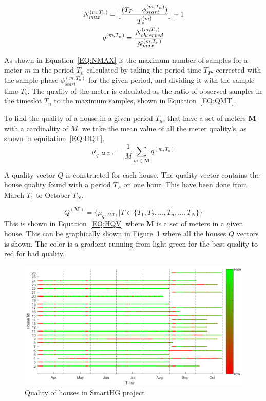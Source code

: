 \begin{gather}
		N_{max}^{(m,T_n)} = \lfloor \frac{(T_{P}-\phi_{start}^{(m,T_n)})}{T_s^{(m)}}\rfloor + 1 \label{EQ:NMAX} \\
		q^{(m,T_n)} = \frac{N_{observed}^{(m,T_n)}}{ N_{max}^{(m,T_n)} } \label{EQ:QMT}
\end{gather}

As shown in Equation~\ref{EQ:NMAX} is the maximum number of samples for a meter $m$ in the period $T_n$ calculated by taking the period time $T_P$, corrected with the sample phase $\phi_{start}^{(m,T_n)}$ for the given period, and dividing it with the sample time $T_s$. The  quality of the meter is calculated as the ratio of observed samples in the timeslot $T_n$ to the maximum samples, shown in Equation~\ref{EQ:QMT}. 

To find the quality of a house in a given period $T_n$, that have a set of meters $\mathbf{M}$ with a cardinality of $M$, we take the mean value of all the meter quality's, as shown in equitation~\ref{EQ:HQT}.  
\begin{equation}
	\mu_{q^{(\mathbf{M},T_n)}} = \frac{1}{M} \sum_{m \in \mathbf{M}} q^{(m,T_n)}
	\label{EQ:HQT}
\end{equation}



A quality vector $Q$ is constructed for each house. The quality vector contains the house quality found with a period $T_P$ on one hour. This have been done from March $T_1$ to October $T_N$. 

\begin{equation}
	Q^{(\mathbf{M})} = \{ \mu_{q^{(M,T)}} | T \in \{T_1, T_2, ... ,T_n,..., T_N  \} \}
	\label{EQ:HQV}
\end{equation}
This is shown in Equation~\ref{EQ:HQV} where $\mathbf{M}$ is a set of meters in a given house. This can be graphically shown in Figure~\ref{fig:SmartHGQuality} where all the houses $Q$ vectors is shown. The color is a gradient running from light green for the best quality to red for bad quality.
\begin{figure}[H]
\centering
\includegraphics[width=1\textwidth]{billeder/QualityBig.png}
\caption{Quality of houses in SmartHG project}
\label{fig:SmartHGQuality}
\end{figure} 

